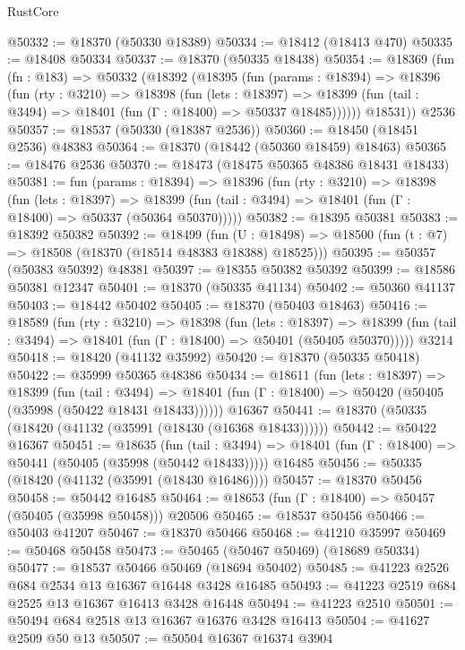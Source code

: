 \begin{lexlean}{RustCore}
\begin{coremodule}
@50332 := @18370 (@50330 @18389)
@50334 := @18412 (@18413 @470)
@50335 := @18408 @50334
@50337 := @18370 (@50335 @18438)
@50354 := @18369
    (fun (fn : @183) =>
    @50332
      (@18392
        (@18395
          (fun (params : @18394) =>
          @18396
            (fun (rty : @3210) =>
            @18398
              (fun (lets : @18397) =>
              @18399 (fun (tail : @3494) => @18401 (fun (Γ : @18400) => @50337 @18485))))))
        @18531))
    @2536
@50357 := @18537 (@50330 (@18387 @2536))
@50360 := @18450 (@18451 @2536) @48383
@50364 := @18370 (@18442 (@50360 @18459) @18463)
@50365 := @18476 @2536
@50370 := @18473 (@18475 @50365 @48386 @18431 @18433)
@50381 := fun (params : @18394) =>
  @18396
    (fun (rty : @3210) =>
    @18398
      (fun (lets : @18397) =>
      @18399 (fun (tail : @3494) => @18401 (fun (Γ : @18400) => @50337 (@50364 @50370)))))
@50382 := @18395 @50381
@50383 := @18392 @50382
@50392 := @18499
    (fun (U : @18498) => @18500 (fun (t : @7) => @18508 (@18370 (@18514 @48383 @18388) @18525)))
@50395 := @50357 (@50383 @50392) @48381
@50397 := @18355 @50382 @50392
@50399 := @18586 @50381 @12347
@50401 := @18370 (@50335 @41134)
@50402 := @50360 @41137
@50403 := @18442 @50402
@50405 := @18370 (@50403 @18463)
@50416 := @18589
    (fun (rty : @3210) =>
    @18398
      (fun (lets : @18397) =>
      @18399 (fun (tail : @3494) => @18401 (fun (Γ : @18400) => @50401 (@50405 @50370)))))
    @3214
@50418 := @18420 (@41132 @35992)
@50420 := @18370 (@50335 @50418)
@50422 := @35999 @50365 @48386
@50434 := @18611
    (fun (lets : @18397) =>
    @18399
      (fun (tail : @3494) =>
      @18401 (fun (Γ : @18400) => @50420 (@50405 (@35998 (@50422 @18431 @18433))))))
    @16367
@50441 := @18370 (@50335 (@18420 (@41132 (@35991 (@18430 (@16368 @18433))))))
@50442 := @50422 @16367
@50451 := @18635
    (fun (tail : @3494) => @18401 (fun (Γ : @18400) => @50441 (@50405 (@35998 (@50442 @18433)))))
    @16485
@50456 := @50335 (@18420 (@41132 (@35991 (@18430 @16486))))
@50457 := @18370 @50456
@50458 := @50442 @16485
@50464 := @18653 (fun (Γ : @18400) => @50457 (@50405 (@35998 @50458))) @20506
@50465 := @18537 @50456
@50466 := @50403 @41207
@50467 := @18370 @50466
@50468 := @41210 @35997
@50469 := @50468 @50458
@50473 := @50465 (@50467 @50469) (@18689 @50334)
@50477 := @18537 @50466 @50469 (@18694 @50402)
@50485 := @41223 @2526 @684 @2534 @13 @16367 @16448 @3428 @16485
@50493 := @41223 @2519 @684 @2525 @13 @16367 @16413 @3428 @16448
@50494 := @41223 @2510
@50501 := @50494 @684 @2518 @13 @16367 @16376 @3428 @16413
@50504 := @41627 @2509 @50 @13
@50507 := @50504 @16367 @16374 @3904

\end{coremodule}
\end{lexlean}
